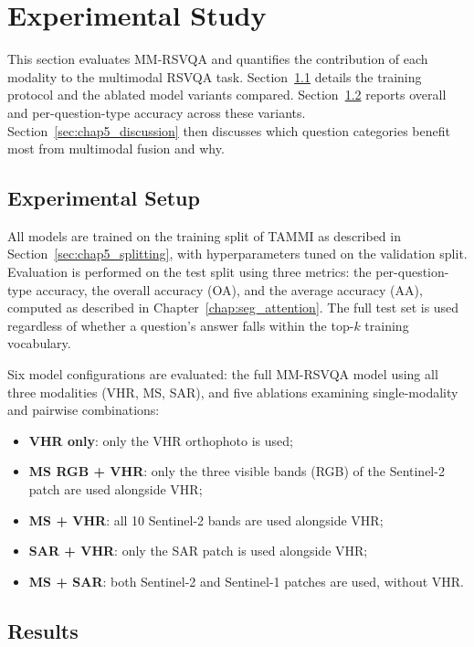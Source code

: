 \section{Experimental Study}
\label{sec:chap5_experiments}
This section evaluates MM-RSVQA and quantifies the contribution of each modality to the multimodal RSVQA task. 
Section~\ref{sec:chap5_setup} details the training protocol and the ablated model variants compared. 
Section~\ref{sec:chap5_results} reports overall and per-question-type accuracy across these variants. 
Section~\ref{sec:chap5_discussion} then discusses which question categories benefit most from multimodal fusion and why.
\subsection{Experimental Setup}
\label{sec:chap5_setup}

All models are trained on the training split of TAMMI
as described in Section~\ref{sec:chap5_splitting}, with
hyperparameters tuned on the validation split. Evaluation
is performed on the test split using three metrics: the
per-question-type accuracy, the overall accuracy (OA),
and the average accuracy (AA), computed as described in
Chapter~\ref{chap:seg_attention}. The full test set is
used regardless of whether a question's answer falls
within the top-$k$ training vocabulary.

Six model configurations are evaluated: the full MM-RSVQA
model using all three modalities (VHR, MS, SAR), and five
ablations examining single-modality and pairwise
combinations:
\begin{itemize}
    \item \textbf{VHR only}: only the VHR orthophoto is
    used;
    \item \textbf{MS RGB + VHR}: only the three visible
    bands (RGB) of the Sentinel-2 patch are used alongside
    VHR;
    \item \textbf{MS + VHR}: all 10 Sentinel-2 bands are
    used alongside VHR;
    \item \textbf{SAR + VHR}: only the SAR patch is used
    alongside VHR;
    \item \textbf{MS + SAR}: both Sentinel-2 and Sentinel-1
    patches are used, without VHR.
\end{itemize}

\subsection{Results}
\label{sec:chap5_results}

